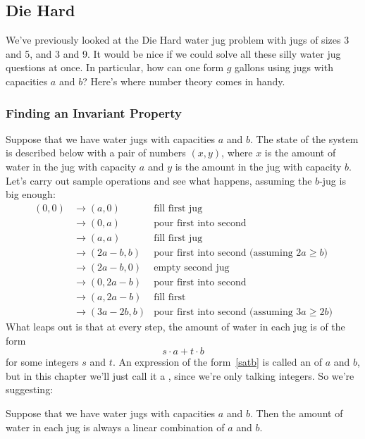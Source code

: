 
\subsection{Die Hard}

We've previously looked at the Die Hard water jug problem with jugs of
sizes 3 and 5, and 3 and 9.  It would be nice if we could solve all these
silly water jug questions at once.  In particular, how can one form $g$
gallons using jugs with capacities $a$ and $b$?  Here's where number
theory comes in handy.

\subsubsection{Finding an Invariant Property}

Suppose that we have water jugs with capacities $a$ and $b$.  The state of
the system is described below with a pair of numbers $(x, y)$, where $x$
is the amount of water in the jug with capacity $a$ and $y$ is the amount
in the jug with capacity $b$.  Let's carry out sample operations and see
what happens, assuming the $b$-jug is big enough:
%
\begin{align*}
(0,0)
& \rightarrow (a,0) & \text{fill first jug} \\
& \rightarrow (0,a) & \text{pour first into second} \\
& \rightarrow (a, a) & \text{fill first jug} \\
& \rightarrow (2a-b, b) & \text{pour first into second (assuming $2a \geq b$)} \\
& \rightarrow (2a-b, 0) & \text{empty second jug} \\
& \rightarrow (0, 2a-b) & \text{pour first into second} \\
& \rightarrow (a, 2a-b) & \text{fill first} \\
& \rightarrow (3a-2b, b) & \text{pour first into second (assuming $3a \geq 2b$)}
\end{align*}
%
What leaps out is that at every step, the amount of water in each jug is
of the form
%
\begin{equation}\label{satb}
s \cdot a + t \cdot b
\end{equation}
%
for some integers $s$ and $t$.  An expression of the form~\eqref{satb} is
called an  of $a$ and $b$, but in this
chapter we'll just call it a , since we're only
talking integers.  So we're suggesting:
\begin{lemma}
\label{lem:waterjugs}
Suppose that we have water jugs with capacities $a$ and $b$.  Then the
amount of water in each jug is always a linear combination of $a$ and
$b$.
\end{lemma}

